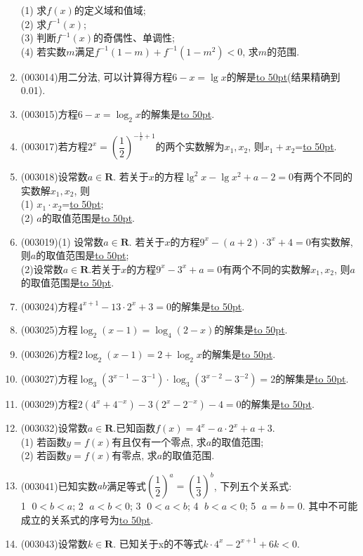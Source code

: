\documentclass[10pt,a4paper]{article}
\newcommand{\blank}[1]{\underline{\hbox to #1pt{}}}
\begin{document}
\begin{enumerate}[1.]
(1) 求$f(x)$的定义域和值域;\\
(2) 求$f^{-1}(x)$;\\
(3) 判断$f^{-1}(x)$的奇偶性、单调性;\\
(4) 若实数$m$满足$f^{-1}(1-m)+f^{-1}(1-m^2)<0$, 求$m$的范围.
\item {\tiny (003014)}用二分法, 可以计算得方程$6-x=\lg x$的解是\blank{50}(结果精确到0.01).
\item {\tiny (003015)}方程$6-x=\log_2 x$的解集是\blank{50}.
\item {\tiny (003017)}若方程$2^x=(\dfrac 12)^{-\frac 1x+1}$的两个实数解为$x_1, x_2$, 则$x_1+x_2$=\blank{50}.
\item {\tiny (003018)}设常数$a\in \mathbf{R}$. 若关于$x$的方程$\lg^2x-\lg x^2+a-2=0$有两个不同的实数解$x_1, x_2$, 则\\
(1) $x_1\cdot x_2$=\blank{50};\\
(2) $a$的取值范围是\blank{50}.
\item {\tiny (003019)}(1) 设常数$a\in \mathbf{R}$. 若关于$x$的方程$9^x-(a+2)\cdot 3^x+4=0$有实数解, 则$a$的取值范围是\blank{50};\\
(2)设常数$a\in \mathbf{R}$.若关于$x$的方程$9^x-3^x+a=0$有两个不同的实数解$x_1, x_2$, 则$a$的取值范围是\blank{50}.
\item {\tiny (003024)}方程$4^{x+1}-13\cdot 2^x+3=0$的解集是\blank{50}.
\item {\tiny (003025)}方程$\log_2(x-1)=\log_4(2-x)$的解集是\blank{50}.
\item {\tiny (003026)}方程$2\log_2(x-1)=2+\log_2 x$的解集是\blank{50}.
\item {\tiny (003027)}方程$\log_3(3^{x-1}-3^{-1})\cdot \log_3(3^{x-2}-3^{-2})=2$的解集是\blank{50}.
\item {\tiny (003029)}方程$2(4^x+4^{-x})-3(2^x-2^{-x})-4=0$的解集是\blank{50}.
\item {\tiny (003032)}设常数$a\in \mathbf{R}$.已知函数$f(x)=4^x-a\cdot 2^x+a+3$.\\
(1) 若函数$y=f(x)$有且仅有一个零点, 求$a$的取值范围;\\
(2) 若函数$y=f(x)$有零点, 求$a$的取值范围.
\item {\tiny (003041)}已知实数$ab$满足等式$(\dfrac 12)^a=(\dfrac 13)^b$, 下列五个关系式:\\
\textcircled{1} $0<b<a$; \textcircled{2} $a<b<0$; \textcircled{3} $0<a<b$; \textcircled{4} $b<a<0$; \textcircled{5} $a=b=0$. 其中不可能成立的关系式的序号为\blank{50}.
\item {\tiny (003043)}设常数$k\in \mathbf{R}$. 已知关于x的不等式$k\cdot 4^x-2^{x+1}+6k<0$.\\

\end{enumerate}
\end{document}
